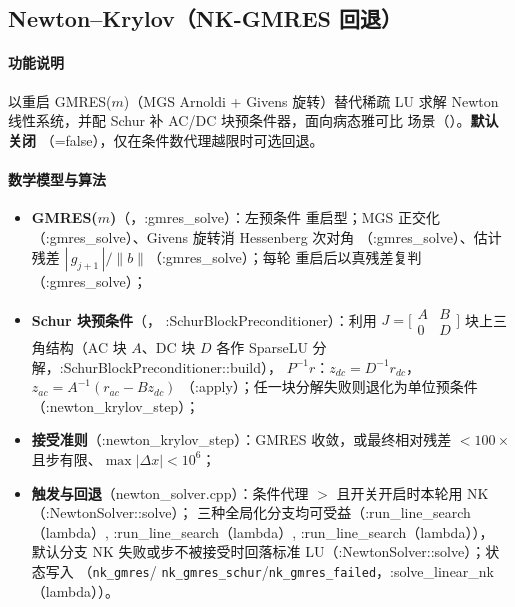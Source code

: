 \subsection{Newton--Krylov（NK-GMRES 回退）}\label{sec:robust:nk}

\paragraph{功能说明} 以重启 GMRES($m$)（MGS Arnoldi + Givens 旋转）替代稀疏
LU 求解 Newton 线性系统，并配 Schur 补 AC/DC 块预条件器，面向病态雅可比
场景（）。\textbf{默认关闭}
（=false），仅在条件数代理越限时可选回退。
\paragraph{数学模型与算法}
\begin{itemize}
  \item \textbf{GMRES($m$)}（，:gmres\_solve）：左预条件
        重启型；MGS 正交化（:gmres\_solve）、Givens 旋转消 Hessenberg 次对角
        （:gmres\_solve）、估计残差 $|\,g_{j+1}\,|/\lVert b\rVert$（:gmres\_solve）；每轮
        重启后以真残差复判（:gmres\_solve）；
  \item \textbf{Schur 块预条件}（，
        :SchurBlockPreconditioner）：利用 $J=\big[\begin{smallmatrix}A&B\\0&D\end{smallmatrix}\big]$
        块上三角结构（AC 块 $A$、DC 块 $D$ 各作 SparseLU 分解，:SchurBlockPreconditioner::build），
        $P^{-1}r$：$z_{dc}=D^{-1}r_{dc}$，$z_{ac}=A^{-1}(r_{ac}-Bz_{dc})$
        （:apply）；任一块分解失败则退化为单位预条件（:newton\_krylov\_step）；
  \item \textbf{接受准则}（:newton\_krylov\_step）：GMRES 收敛，或最终相对残差
        $<100\times$ 且步有限、$\max|\Delta x|<10^{6}$；
  \item \textbf{触发与回退}（newton\_solver.cpp）：条件代理
        $>$ 且开关开启时本轮用 NK（:NewtonSolver::solve）；
        三种全局化分支均可受益（:run\_line\_search（lambda）, :run\_line\_search（lambda）, :run\_line\_search（lambda）），
        默认分支 NK 失败或步不被接受时回落标准 LU（:NewtonSolver::solve）；状态写入
        （\texttt{nk\_gmres}/
        \texttt{nk\_gmres\_schur}/\texttt{nk\_gmres\_failed}，:solve\_linear\_nk（lambda））。
\end{itemize}
